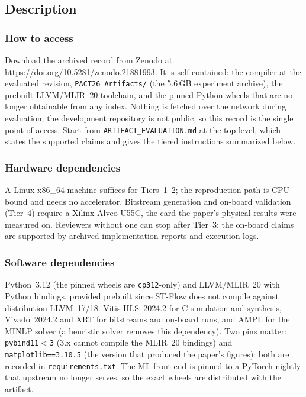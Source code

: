 \subsection{Description}

\subsubsection{How to access}

Download the archived record from Zenodo at \url{https://doi.org/10.5281/zenodo.21881993}. It is self-contained: the
compiler at the evaluated revision, \texttt{PACT26\_Artifacts/} (the 5.6\,GB experiment
archive), the prebuilt LLVM/MLIR~20 toolchain, and the pinned Python wheels that are no
longer obtainable from any index. Nothing is fetched over the network during evaluation;
the development repository is not public, so this record is the single point of access.
Start from \texttt{ARTIFACT\_EVALUATION.md} at the top level, which states the supported
claims and gives the tiered instructions summarized below.

\subsubsection{Hardware dependencies}

A Linux x86\_64 machine suffices for Tiers~1--2; the reproduction path is CPU-bound and
needs no accelerator. Bitstream generation and on-board validation (Tier~4) require a
Xilinx Alveo U55C, the card the paper's physical results were measured on. Reviewers
without one can stop after Tier~3: the on-board claims are supported by archived
implementation reports and execution logs.

\subsubsection{Software dependencies}

Python~3.12 (the pinned wheels are \texttt{cp312}-only) and LLVM/MLIR~20 with Python
bindings, provided prebuilt since ST-Flow does not compile against distribution
LLVM~17/18. Vitis HLS~2024.2 for C-simulation and synthesis, Vivado~2024.2 and XRT for
bitstreams and on-board runs, and AMPL for the MINLP solver (a heuristic solver removes
this dependency). Two pins matter: \texttt{pybind11$<$3} (3.x cannot compile the MLIR~20
bindings) and \texttt{matplotlib==3.10.5} (the version that produced the paper's
figures); both are recorded in \texttt{requirements.txt}. The ML front-end is pinned to a
PyTorch nightly that upstream no longer serves, so the exact wheels are distributed with
the artifact.

